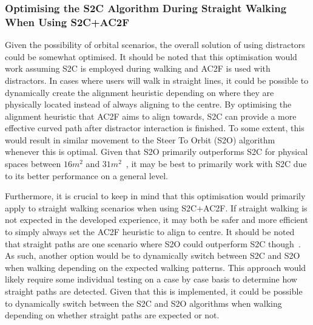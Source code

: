 \subsubsection{Optimising the S2C Algorithm During Straight Walking When Using S2C+AC2F}
Given the possibility of orbital scenarios, the overall solution of using distractors could be somewhat optimised. It should be noted that this optimisation would work assuming S2C is employed during walking and AC2F is used with distractors. In cases where users will walk in straight lines, it could be possible to dynamically create the alignment heuristic depending on where they are physically located instead of always aligning to the centre. By optimising the alignment heuristic that AC2F aims to align towards, S2C can provide a more effective curved path after distractor interaction is finished. To some extent, this would result in similar movement to the Steer To Orbit (S2O) algorithm whenever this is optimal. Given that S2O primarily outperforms S2C for physical spaces between $16m^2$ and $31m^2$~\cite{azmandian2015physical}, it may be best to primarily work with S2C due to its better performance on a general level. 

Furthermore, it is crucial to keep in mind that this optimisation would primarily apply to straight walking scenarios when using S2C+AC2F. If straight walking is not expected in the developed experience, it may both be safer and more efficient to simply always set the AC2F heuristic to align to centre. It should be noted that straight paths are one scenario where S2O could outperform S2C though~\cite{hodgson2013comparing}. As such, another option would be to dynamically switch between S2C and S2O when walking depending on the expected walking patterns. This approach would likely require some individual testing on a case by case basis to determine how straight paths are detected. Given that this is implemented, it could be possible to dynamically switch between the S2C and S2O algorithms when walking depending on whether straight paths are expected or not. 

